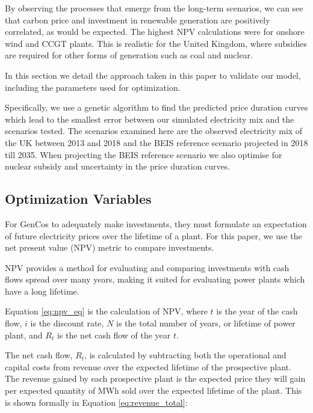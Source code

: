 By observing the processes that emerge from the long-term scenarios, we can see that carbon price and investment in renewable generation are positively correlated, as would be expected. The highest NPV calculations were for onshore wind and CCGT plants. This is realistic for the United Kingdom, where subsidies are required for other forms of generation such as coal and nuclear.




In this section we detail the approach taken in this paper to validate our model, including the parameters used for optimization. 

Specifically, we use a genetic algorithm to find the predicted price duration curves which lead to the smallest error between our simulated electricity mix and the scenarios tested. The scenarios examined here are the observed electricity mix of the UK between 2013 and 2018 and the BEIS reference scenario projected in 2018 till 2035. When projecting the BEIS reference scenario we also optimise for nuclear subsidy and uncertainty in the price duration curves.





\subsection{Optimization Variables}


For GenCos to adequately make investments, they must formulate an expectation of future electricity prices over the lifetime of a plant. For this paper, we use the net present value (NPV) metric to compare investments. 


NPV provides a method for evaluating and comparing investments with cash flows spread over many years, making it suited for evaluating power plants which have a long lifetime.  

Equation \ref{eq:npv_eq} is the calculation of NPV, where $t$ is the year of the cash flow, $i$ is the discount rate, $N$ is the total number of years, or lifetime of power plant, and $R_t$ is the net cash flow of the year $t$.

The net cash flow, $R_t$, is calculated by subtracting both the operational and capital costs from revenue over the expected lifetime of the prospective plant. The revenue gained by each prospective plant is the expected price they will gain per expected quantity of MWh sold over the expected lifetime of the plant. This is shown formally in Equation \ref{eq:revenue_total}:

